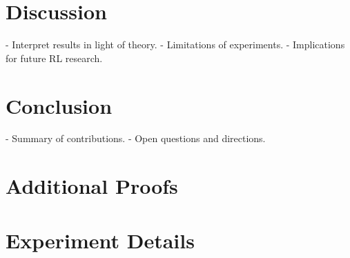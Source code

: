 \documentclass[12pt,a4paper]{report}
\begin{document}
\chapter{Discussion}
- Interpret results in light of theory.  
- Limitations of experiments.  
- Implications for future RL research.  

\chapter{Conclusion}
- Summary of contributions.  
- Open questions and directions.  




\appendix
\chapter{Additional Proofs}
\chapter{Experiment Details}
\end{document}
